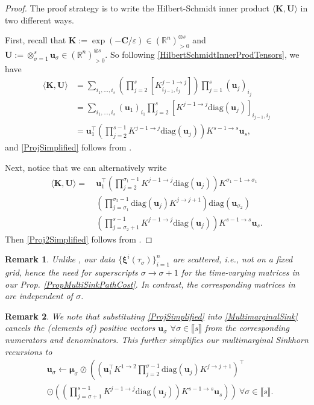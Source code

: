 \documentclass[letterpaper, 10pt, twocolumn]{ieeeconf}      %
\newtheorem{remark}{Remark}
\newcommand{\diag}{\mathrm{diag}}
\begin{document}
\begin{proof}
The proof strategy is to write the Hilbert-Schmidt inner product $\langle\bm{K},\bm{U}\rangle$ in two different ways.

First, recall that $\bm{K}:=\exp(-\bm{C}/\varepsilon)\in\left(\mathbb{R}^{n}\right)^{\otimes s}_{> 0}$ and $\bm{U}:=\otimes_{\sigma=1}^{s}\bm{u}_{\sigma}\in\left(\mathbb{R}^{n}\right)^{\otimes s}_{> 0}$. So following \eqref{HilbertSchmidtInnerProdTensors}, we have
\begin{align*}
    \langle\bm{K},\bm{U}\rangle &= \sum_{i_1,\dots,i_s}\left(\prod_{j=2}^{s}\left[K^{j-1\to j}_{i_{j-1},i_j}\right]\right)\prod_{j=1}^s(\bm{u}_j)_{i_j} \\
    &= \sum_{i_1,\dots,i_s}(\bm{u}_1)_{i_1}\prod_{j=2}^{s}\left[K^{j-1\to j}\diag(\bm{u}_j)\right]_{i_{j-1},i_j} \\
    &= \bm{u}_1^\top \left(\prod_{j=2}^{s-1}K^{j-1\to j}\diag(\bm{u}_j)\right)K^{s-1\to s}\bm{u}_s,
\end{align*}
and \eqref{ProjSimplified} follows from \cite[Lemma 1 in Appendix 1]{elvander2020multi}. 

Next, notice that we can alternatively write
\begin{align*}
    \langle\bm{K},\bm{U}\rangle = \:&\bm{u}_1^\top \left(\prod_{j=2}^{\sigma_1-1}K^{j-1\to j}\diag(\bm{u}_j)\right)K^{\sigma_1-1\to \sigma_1}\\
    &\left(\prod_{j=\sigma_1}^{\sigma_2-1}\diag(\bm{u}_j)K^{j\to j+1}\right)\diag(\bm{u}_{\sigma_2})\\
    &\left(\prod_{j=\sigma_2+1}^{s-1}K^{j-1\to j}\diag(\bm{u}_{j})\right)K^{s-1\to s}\bm{u}_s.
\end{align*}
Then \eqref{Proj2Simplified} follows from \cite[Lemma 2 in Appendix 1]{elvander2020multi}.
\end{proof}
\begin{remark}
Unlike \cite[Prop. 2]{elvander2020multi}, our data $\{\bm{\xi}^{i}(\tau_{\sigma})\}_{i=1}^{n}$ are scattered, i.e., not on a fixed grid, hence the need for superscripts $\sigma\rightarrow\sigma + 1$ for the time-varying matrices in our Prop. \ref{PropMultiSinkPathCost}. In contrast, the corresponding matrices in \cite[Prop. 2]{elvander2020multi} are independent of $\sigma$.
\end{remark}
\begin{remark}
We note that substituting \eqref{ProjSimplified} into \eqref{MultimarginalSink} cancels the (elements of) positive vectors $\bm{u}_{\sigma}$ $\forall\sigma\in\llbracket s\rrbracket$ from the corresponding numerators and denominators. This further simplifies our multimarginal Sinkhorn recursions to
\begin{align}
&\bm{u}_{\sigma}\leftarrow \bm{\mu}_{\sigma}\oslash\!\!\left(\!\!\!\left(\!\bm{u}_1^{\!\top} K^{1\to2}\!\prod_{j=2}^{\sigma-1}\!\diag(\bm{u}_j)K^{j\to j+1}\!\!\right)^{\!\!\top}\right.\nonumber\\
&\left.\odot\left(\!\!\left(\prod_{j=\sigma+1}^{s-1}K^{j-1\to j}\diag(\bm{u}_j)\!\right)\!\!K^{s-1\to s}\bm{u}_s\!\!\right)\!\!\right)\:\forall\sigma\in\llbracket s\rrbracket.
\label{MultimargSinkFinal}    
\end{align}
\end{remark}
\end{document}
